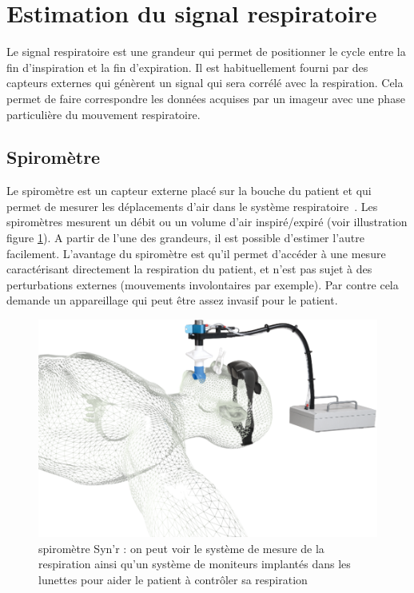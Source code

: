 \section{Estimation du signal respiratoire}

Le signal respiratoire est une grandeur qui permet de positionner le cycle entre la fin d'inspiration et la fin d'expiration. Il est habituellement fourni par des capteurs externes qui génèrent un signal qui sera corrélé avec la respiration. Cela permet de faire correspondre les données acquises par un imageur avec une phase particulière du mouvement respiratoire.

\subsection{Spiromètre}
\label{lab:spirometre}
Le spiromètre est un capteur externe placé sur la bouche du patient et qui permet de mesurer les déplacements d'air dans le système respiratoire~\cite{guivarc2004synchronization}. Les spiromètres mesurent un débit ou un volume d'air inspiré/expiré (voir illustration figure \ref{fig:spirometre}). A partir de l'une des grandeurs, il est possible d'estimer l'autre facilement. L'avantage du spiromètre est qu'il permet d'accéder à une mesure caractérisant directement la respiration du patient, et n'est pas sujet à des perturbations externes (mouvements involontaires par exemple). Par contre cela demande un appareillage qui peut être assez invasif pour le patient.

\begin{figure}[h!]
	\begin{center}
		\includegraphics[width=12cm]{images/spiro}
	\end{center}
	\caption{spiromètre Syn'r : on peut voir le système de mesure de la respiration ainsi qu'un système de moniteurs implantés dans les lunettes pour aider le patient à contrôler sa respiration} 
	\label{fig:spirometre}
\end{figure}

